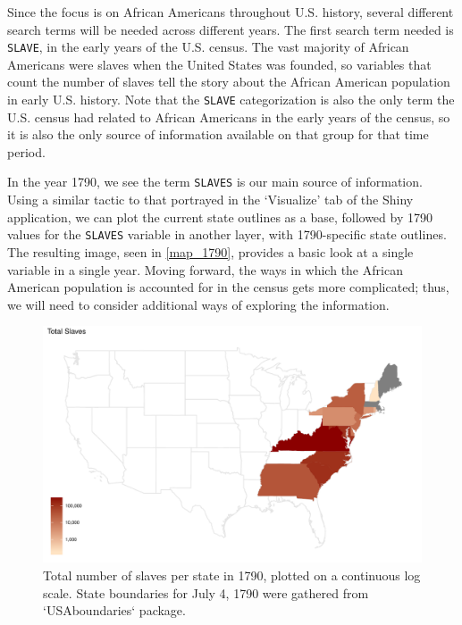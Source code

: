 \documentclass[DIV=calc, paper=a4, fontsize=10pt, twocolumn]{scrartcl}\usepackage[]{graphicx}\usepackage[]{color}
\newenvironment{knitrout}{}{} %
\begin{document}
\par Since the focus is on African Americans throughout U.S. history, several different search terms will be needed across different years. The first search term needed is \texttt{SLAVE}, in the early years of the U.S. census. The vast majority of African Americans were slaves when the United States was founded, so variables that count the number of slaves tell the story about the African American population in early U.S. history. Note that the \texttt{SLAVE} categorization is also the only term the U.S. census had related to African Americans in the early years of the census, so it is also the only source of information available on that group for that time period.  





\par In the year 1790, we see the term \texttt{SLAVES} is our main source of information. Using a similar tactic to that portrayed in the `Visualize' tab of the Shiny application, we can plot the current state outlines as a base, followed by 1790 values for the \texttt{SLAVES} variable in another layer, with 1790-specific state outlines. The resulting image, seen in \autoref{map_1790}, provides a basic look at a single variable in a single year. Moving forward, the ways in which the African American population is accounted for in the census gets more complicated; thus, we will need to consider additional ways of exploring the information.  

\begin{knitrout}
\color{fgcolor}\begin{figure}[h]
\includegraphics[width=.5\textwidth]{figure/map_1790-1} \caption[Total number of slaves per state in 1790, plotted on a continuous log scale]{Total number of slaves per state in 1790, plotted on a continuous log scale. State boundaries for July 4, 1790 were gathered from `USAboundaries` package.}\label{fig:map_1790}
\end{figure}


\end{knitrout}
\end{document}
